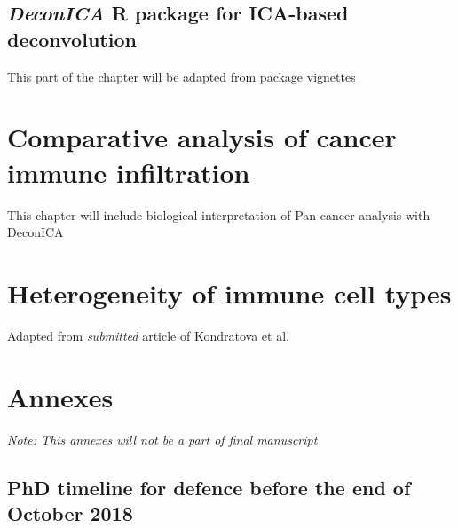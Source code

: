 \documentclass[12pt,]{book}
\theoremstyle{definition}
\theoremstyle{definition}
\theoremstyle{definition}
\theoremstyle{remark}
\begin{document}
\hypertarget{deconica-r-package-for-ica-based-deconvolution}{%
\section{\texorpdfstring{\emph{DeconICA} R package for ICA-based
deconvolution}{DeconICA R package for ICA-based deconvolution}}\label{deconica-r-package-for-ica-based-deconvolution}}

This part of the chapter will be adapted from package vignettes



\hypertarget{results}{%
\chapter{Comparative analysis of cancer immune
infiltration}\label{results}}

This chapter will include biological interpretation of Pan-cancer
analysis with DeconICA

\hypertarget{section}{%
\section{}\label{section}}

\hypertarget{map}{%
\chapter{Heterogeneity of immune cell types}\label{map}}

Adapted from \emph{submitted} article of Kondratova et al.



\hypertarget{annexes}{%
\chapter*{Annexes}\label{annexes}}

\emph{Note: This annexes will not be a part of final manuscript}

\hypertarget{phd-timeline-for-defence-before-the-end-of-october-2018}{%
\section*{PhD timeline for defence before the end of October
2018}\label{phd-timeline-for-defence-before-the-end-of-october-2018}}
\end{document}

